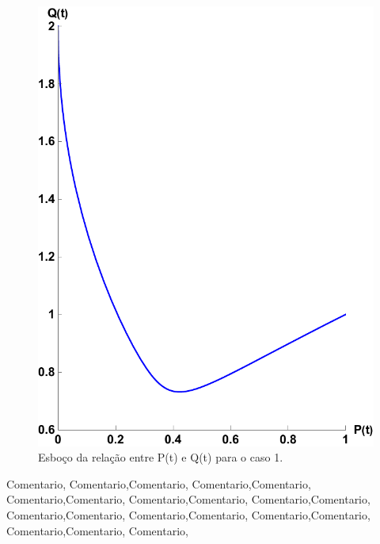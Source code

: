 \begin{figure}[htbp]
\centering
\includegraphics[keepaspectratio=true,scale=0.5]{caso1_b.pdf}
\caption{Esboço da relação entre P(t) e Q(t) para o caso 1.}
\label{fig:xx}
\end{figure}
\bigskip
\noindent
Comentario, Comentario,Comentario, Comentario,Comentario, Comentario,Comentario, Comentario,Comentario, Comentario,Comentario, Comentario,Comentario, Comentario,Comentario, Comentario,Comentario, Comentario,Comentario, Comentario,
\pagebreak


